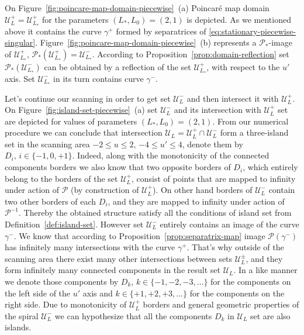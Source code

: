 On Figure~\ref{fig:poincare-map-domain-piecewise}~(a) Poincar\'e map   domain $\mathscr{U}_L^+ = \mathscr{U}_{L_*}^+$ for the parameters $(L_*, L_0) = (2, 1)$ is depicted.
As we mentioned above it contains the curve $\gamma^+$ formed by separatrices of \eqref{eq:stationary-piecewise-singular}.
Figure~\ref{fig:poincare-map-domain-piecewise}~(b) represents a $\mathcal{P}_*$-image of $\mathscr{U}_{L_*}^+$, $\mathcal{P}_* (\mathscr{U}_{L_*}^+) = \mathscr{U}_{L_*}^-$.
According to Proposition~\ref{prop:domain-reflection} set $\mathcal{P}_*(\mathscr{U}_{L_*}^-)$ can be obtained by a reflection of the set $\mathscr{U}_{L_*}^+$, with respect to the $u'$ axis.
Set $\mathscr{U}_{L_*}^-$ in its turn contains curve $\gamma^-$.

Let's continue our scanning in order to get set $\mathscr{U}_L^-$ and then intersect it with $\mathscr{U}_L^+$.
On Figure~\ref{fig:island-set-piecewise}~(a) set $\mathscr{U}_L^-$ and its intersection with $\mathscr{U}_L^+$ set are depicted for values of parameters $(L_*, L_0) = (2, 1)$.
From our numerical procedure we can conclude that intersection $\mathscr{U}_L = \mathscr{U}_L^+ \cap \mathscr{U}_L^-$ form a three-island set in the scanning area $-2 \le u \le 2$, $-4 \le u' \le 4$, denote them by $D_i, \, i \in \{ -1, 0, +1 \}$.
Indeed, along with the monotonicity of the connected components borders we also know that two opposite borders of $D_i$, which entirely belong to the borders of the set $\mathscr{U}_L^+$, consist of points that are mapped to infinity under action of $\mathcal{P}$ (by construction of $\mathscr{U}_L^+$).
On other hand borders of $\mathscr{U}_L^-$ contain two other borders of each $D_i$, and they are mapped to infinity under action of $\mathcal{P}^{-1}$.
Thereby the obtained structure satisfy all the conditions of island set from Definition~\ref{def:island-set}.
However set $\mathscr{U}_L^-$ entirely contains an image of the curve $\gamma^-$.
We know that according to Proposition~\ref{prop:separatrix-map} image $\mathcal{P}(\gamma^-)$ has infinitely many intersections with the curve $\gamma^+$.
That's why outside of the scanning area there exist many other intersections between sets $\mathscr{U}_L^{\pm}$, and they form infinitely many connected components in the result set $\mathscr{U}_L$.
In a like manner we denote those components by $D_k$, $k \in \{ -1, -2, -3, \dots \}$ for the components on the left side of the $u'$ axis and $k \in \{ +1, +2, +3, \dots \}$ for the components on the right side. 
Due to monotonicity of $\mathscr{U}_L^+$ borders and general geometric properties of the spiral $\mathscr{U}_L^-$ we can hypothesize that all the components $D_k$ in $\mathscr{U}_L$ set are also islands.

